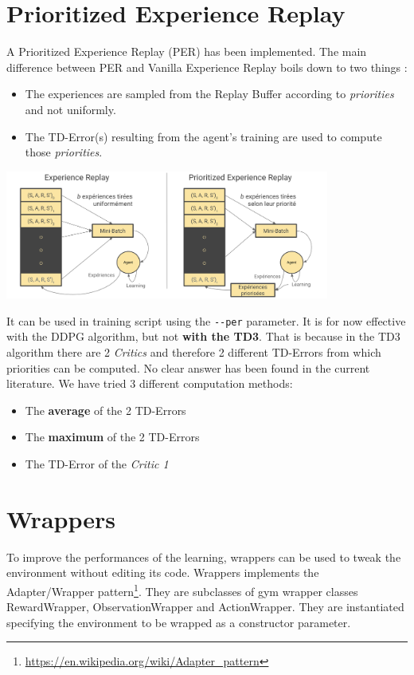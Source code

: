 \section{Prioritized Experience Replay}%

A Prioritized Experience Replay\cite{per} (PER) has been implemented. The main difference between PER and Vanilla Experience Replay boils down to two things :

\begin{itemize}
    \item The experiences are sampled from the Replay Buffer according to \textit{priorities} and not uniformly.
    \item The TD-Error(s) resulting from the agent's training are used to compute those \textit{priorities}.
\end{itemize}

\begin{minipage}{\textwidth}
    \centering
    \includegraphics[width=0.80\textwidth]{images/PER.png}
    \label{fig:per}
\end{minipage}

\bigbreak

It can be used in training script using the \lstinline[language=bash]+--per+ parameter.
It is for now effective with the DDPG algorithm, but not \textbf{with the TD3}. That is because in the TD3 algorithm there are 2 \textit{Critics} and therefore 2 different TD-Errors from which priorities can be computed. No clear answer has been found in the current literature. We have tried 3 different computation methods:
\begin{itemize}
    \item The \textbf{average} of the 2 TD-Errors
    \item The \textbf{maximum} of the 2 TD-Errors
    \item The TD-Error of the \textit{Critic 1}
\end{itemize}

\section{Wrappers}
To improve the performances of the learning, wrappers can be used to tweak the environment without editing its code.
Wrappers implements the Adapter/Wrapper pattern\footnote{\url{https://en.wikipedia.org/wiki/Adapter_pattern}}.
They are subclasses of gym wrapper classes RewardWrapper, ObservationWrapper and ActionWrapper.
They are instantiated specifying the environment to be wrapped as a constructor parameter.

